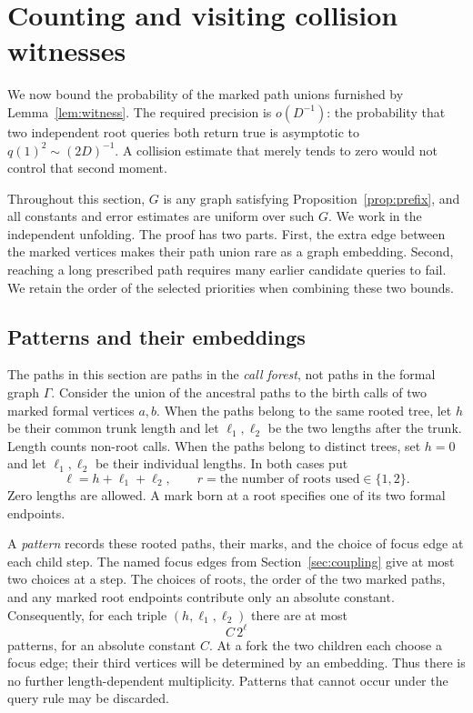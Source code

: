 \section{Counting and visiting collision witnesses}\label{sec:witnesses}

We now bound the probability of the marked path unions furnished by
Lemma~\ref{lem:witness}. The required precision is
$o(D^{-1})$: the probability that two independent root queries both return
true is asymptotic to $q(1)^2\sim(2D)^{-1}$. A collision estimate that merely
tends to zero would not control that second moment.

Throughout this section, $G$ is any graph satisfying
Proposition~\ref{prop:prefix}, and all constants and error estimates are
uniform over such $G$. We work in the independent unfolding. The proof has
two parts. First, the extra edge between the marked vertices makes their
path union rare as a graph embedding. Second, reaching a long prescribed
path requires many earlier candidate queries to fail. We retain the order
of the selected priorities when combining these two bounds.

\subsection{Patterns and their embeddings}

The paths in this section are paths in the \emph{call forest}, not paths
in the formal graph $\Gamma$. Consider the union of the ancestral paths
to the birth calls of two marked formal vertices $a,b$. When the paths
belong to the same rooted tree, let $h$ be their common trunk length and
let $\ell_1,\ell_2$ be the two lengths after the trunk. Length counts
non-root calls. When the paths belong to distinct trees, set $h=0$ and
let $\ell_1,\ell_2$ be their individual lengths. In both cases put
\[
 \ell=h+\ell_1+\ell_2,
 \qquad r=\text{the number of roots used}\in\{1,2\}.
\]
Zero lengths are allowed. A mark born at a root specifies one of its two
formal endpoints.

A \emph{pattern} records these rooted paths, their marks, and the choice
of focus edge at each child step. The named focus edges from
Section~\ref{sec:coupling} give at most two choices at a step. The choices
of roots, the order of the two marked paths, and any marked root endpoints
contribute only an absolute constant. Consequently, for each triple
$(h,\ell_1,\ell_2)$ there are at most
\begin{equation}\label{eq:pattern-count}
 C\,2^\ell
\end{equation}
patterns, for an absolute constant $C$. At a fork the two children each
choose a focus edge; their third vertices will be determined by an
embedding. Thus there is no further length-dependent multiplicity.
Patterns that cannot occur under the query rule may be discarded.



